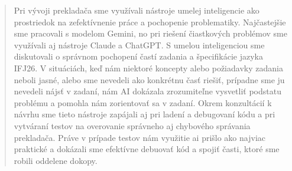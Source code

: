 \begin{quote}
Pri vývoji prekladača sme využívali nástroje umelej inteligencie ako prostriedok na zefektívnenie práce a pochopenie problematiky. Najčastejšie sme pracovali s modelom Gemini, no pri riešení čiastkových problémov sme využívali aj nástroje Claude a ChatGPT. S umelou inteligenciou sme diskutovali o správnom pochopení častí zadania a špecifikácie jazyka IFJ26. V situáciách, keď nám niektoré koncepty alebo požiadavky zadania neboli jasné, alebo sme nevedeli ako konkrétnu časť riešiť, prípadne sme ju nevedeli nájsť v zadaní, nám AI dokázala zrozumiteľne vysvetliť podstatu problému a pomohla nám zorientovať sa v zadaní. Okrem konzultácií k návrhu sme tieto nástroje zapájali aj pri ladení a debugovaní kódu a pri vytváraní testov na overovanie správneho aj chybového správania prekladača. Práve v prípade testov nám využitie ai prišlo ako najviac praktické a dokázali sme efektívne debuovať kód a spojiť časti, ktoré sme robili oddelene dokopy.

\end{quote}

